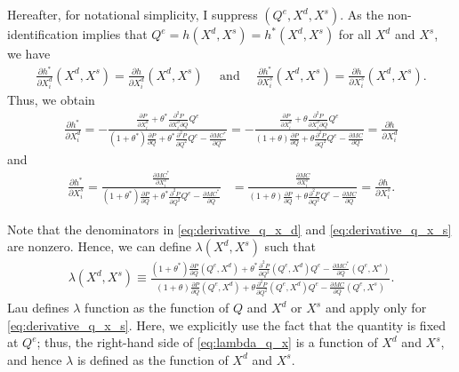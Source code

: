 \documentclass[11pt, a4paper]{article}
\theoremstyle{remark}
\begin{document}
 
Hereafter, for notational simplicity, I suppress $(Q^e, X^{d}, X^{s})$.
As the non-identification implies that $Q^e = h(X^{d}, X^{s}) = h^{*}(X^{d}, X^{s})$ for all $X^{d}$ and $X^{s}$, we have
\begin{align}
    \frac{\partial h^{*}}{\partial X^{d}_{i}}(X^{d}, X^{s})  = \frac{\partial h}{\partial X^{d}_{i}}(X^{d}, X^{s})\quad \text{  and  } \quad \frac{\partial h^{*}}{\partial X^{s}_{i}}(X^{d}, X^{s})  = \frac{\partial h}{\partial X^{s}_{i}}(X^{d}, X^{s}) . \label{eq:observale_equivalence_derivative}
\end{align}
Thus, we obtain 
\begin{align}
     \frac{\partial h^{*}}{\partial X^{d}_{i}}  = - \frac{\frac{\partial P}{\partial X^{d}_{i}} + \theta^{*}\frac{\partial^2 P}{\partial X^{d}_{i}\partial Q}Q^e }{(1+\theta^{*})\frac{\partial P}{\partial Q} + \theta^{*}\frac{\partial^2 P}{\partial Q^2}Q^e - \frac{\partial MC^{*}}{\partial Q^e}} = - \frac{\frac{\partial P}{\partial X^{d}_{i}} + \theta \frac{\partial^2 P}{\partial X^{d}_{i}\partial Q}Q^e }{(1+\theta)\frac{\partial P}{\partial Q} + \theta\frac{\partial^2 P}{\partial Q^2}Q^e - \frac{\partial MC}{\partial Q}} =  \frac{\partial h}{\partial X^{d}_{i}} \label{eq:derivative_q_x_d}
\end{align}
and
\begin{align}
     \frac{\partial h^{*}}{\partial X^{s}_{i}} = \frac{\frac{\partial MC^{*}}{\partial X^{s}_{i}}}{(1+\theta^{*})\frac{\partial P}{\partial Q} + \theta^{*}\frac{\partial^2 P}{\partial Q^2}Q^e - \frac{\partial MC^{*}}{\partial Q}} & = \frac{\frac{\partial MC}{\partial X^{s}_{i}}}{(1+\theta)\frac{\partial P}{\partial Q} + \theta\frac{\partial^2 P}{\partial Q^2}Q^e - \frac{\partial MC}{\partial Q}} =  \frac{\partial h}{\partial X^{s}_{i}} .\label{eq:derivative_q_x_s}
\end{align}

Note that the denominators in \eqref{eq:derivative_q_x_d} and \eqref{eq:derivative_q_x_s} are nonzero.
Hence, we can define $\lambda(X^{d}, X^{s})$ such that
\begin{align}
    \lambda( X^{d}, X^{s}) \equiv \frac{(1+\theta^{*})\frac{\partial P}{\partial Q}(Q^e, X^{d}) + \theta^{*}\frac{\partial^2 P}{\partial Q^2}(Q^e, X^{d})Q^e - \frac{\partial MC^{*}}{\partial Q}(Q^e, X^{s})}{(1+\theta)\frac{\partial P}{\partial Q}(Q^e, X^{d}) + \theta\frac{\partial^2 P}{\partial Q^2}(Q^e, X^{d})Q^e - \frac{\partial MC}{\partial Q}(Q^e, X^{s})}.\label{eq:lambda_q_x}
\end{align}
Lau defines $\lambda$ function as the function of $Q$ and $X^{d}$ or $X^{s}$ and apply only for  \eqref{eq:derivative_q_x_s}.
Here, we explicitly use the fact that the quantity is fixed at $Q^e$; thus, the right-hand side of \eqref{eq:lambda_q_x} is a function of $X^{d}$ and $X^{s}$, and hence $\lambda$ is defined as the function of 
$X^{d}$ and $X^{s}$.
\end{document}
